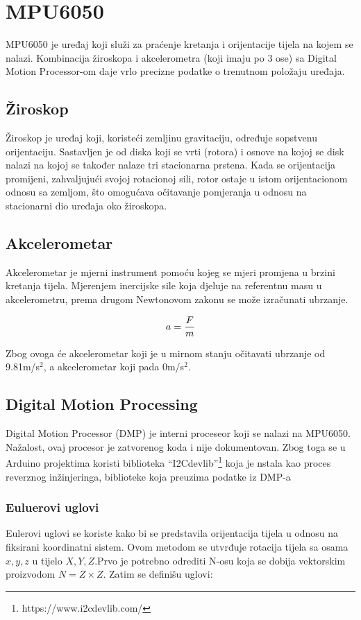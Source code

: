 \documentclass[../Document.tex]{subfiles}
\begin{document}
\section{MPU6050} \label{mpu}

MPU6050 je uređaj koji služi za praćenje kretanja i orijentacije tijela na kojem se nalazi. Kombinacija žiroskopa i akcelerometra (koji imaju po 3 ose) sa Digital Motion Processor-om daje vrlo precizne podatke o trenutnom položaju uređaja.

\subsection{Žiroskop}
Žiroskop je uređaj koji, koristeći zemljinu gravitaciju, određuje sopstvenu orijentaciju. Sastavljen je od diska koji se vrti (rotora) i osnove na kojoj se disk nalazi na kojoj se također nalaze tri stacionarna prstena. Kada se orijentacija promijeni, zahvaljujući svojoj rotacionoj sili, rotor ostaje u istom orijentacionom odnosu sa zemljom, što omogućava očitavanje pomjeranja u odnosu na stacionarni dio uređaja oko žiroskopa.


\subsection{Akcelerometar}
Akcelerometar je mjerni instrument pomoću kojeg se mjeri promjena u brzini kretanja tijela. Mjerenjem inercijske sile koja djeluje na referentnu masu u akcelerometru, prema drugom Newtonovom zakonu se može izračunati ubrzanje.

$$
    \centering
    a = \frac{F}{m}
$$

\noindent Zbog ovoga će akcelerometar koji je u mirnom stanju očitavati ubrzanje od 9.81m/s$^2$, a akcelerometar koji pada 0m/s$^2$.

\subsection{Digital Motion Processing}\label{dmp}

Digital Motion Processor (DMP) je interni proceseor koji se nalazi na MPU6050. Nažalost, ovaj procesor je zatvorenog koda i nije dokumentovan. Zbog toga se u Arduino projektima koristi biblioteka ``I2Cdevlib''\footnote{https://www.i2cdevlib.com/} koja je nstala kao proces reverznog inžinjeringa, biblioteke koja preuzima podatke iz DMP-a

\subsubsection{Euluerovi uglovi}
Eulerovi uglovi se koriste kako bi se predstavila orijentacija tijela u odnosu na fiksirani koordinatni sistem. Ovom metodom se utvrđuje rotacija tijela sa osama $x,y,z$ u tijelo $X,Y,Z$.Prvo je potrebno odrediti N-osu koja se dobija vektorskim proizvodom $N=Z \times Z$. Zatim se definišu uglovi:
\end{document}

